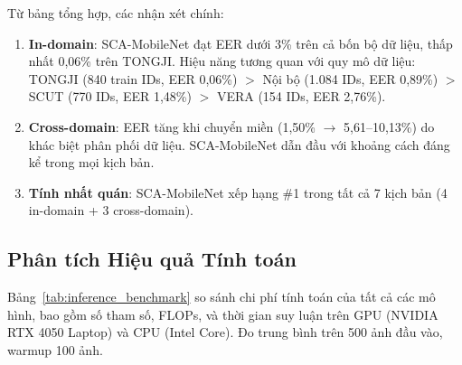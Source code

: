 \documentclass[12pt,a4paper]{article}
\begin{document}
Từ bảng tổng hợp, các nhận xét chính:
\begin{enumerate}
    \item \textbf{In-domain}: SCA-MobileNet đạt EER dưới 3\% trên cả bốn bộ dữ liệu, thấp nhất 0,06\% trên TONGJI. Hiệu năng tương quan với quy mô dữ liệu: TONGJI (840 train IDs, EER 0,06\%) $>$ Nội bộ (1.084 IDs, EER 0,89\%) $>$ SCUT (770 IDs, EER 1,48\%) $>$ VERA (154 IDs, EER 2,76\%).
    \item \textbf{Cross-domain}: EER tăng khi chuyển miền (1,50\% $\rightarrow$ 5,61--10,13\%) do khác biệt phân phối dữ liệu. SCA-MobileNet dẫn đầu với khoảng cách đáng kể trong mọi kịch bản.
    \item \textbf{Tính nhất quán}: SCA-MobileNet xếp hạng \#1 trong tất cả 7 kịch bản (4 in-domain + 3 cross-domain).
\end{enumerate}

\subsection{Phân tích Hiệu quả Tính toán}

Bảng~\ref{tab:inference_benchmark} so sánh chi phí tính toán của tất cả các mô hình, bao gồm số tham số, FLOPs, và thời gian suy luận trên GPU (NVIDIA RTX 4050 Laptop) và CPU (Intel Core). Đo trung bình trên 500 ảnh đầu vào, warmup 100 ảnh.

\begin{table}[H]
\caption{So sánh độ phức tạp tính toán và thời gian suy luận của tất cả các mô hình. Đo trên RTX 4050 Laptop GPU, batch size = 1.}
\begin{center}
\label{tab:inference_benchmark}
\end{center}
\end{table}
\end{document}

